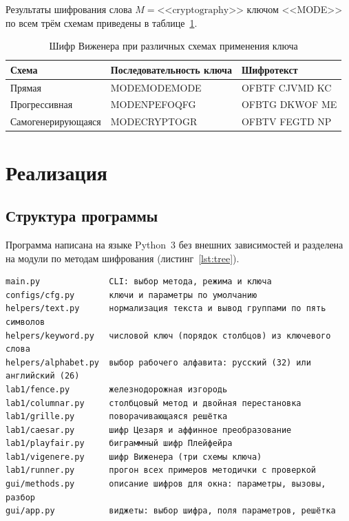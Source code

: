 \documentclass[14pt,a4paper]{extarticle}
\begin{document}
Результаты шифрования слова $M = \text{<<cryptography>>}$ ключом <<MODE>> по всем трём
схемам приведены в таблице~\ref{tab:vigenere}.

\begin{table}[H]
\caption{Шифр Виженера при различных схемах применения ключа}
\label{tab:vigenere}
\centering
\begin{tabularx}{\textwidth}{lXl}
\toprule
Схема & Последовательность ключа & Шифротекст \\
\midrule
Прямая & MODEMODEMODE & OFBTF CJVMD KC \\
Прогрессивная & MODENPEFOQFG & OFBTG DKWOF ME \\
Самогенерирующаяся & MODECRYPTOGR & OFBTV FEGTD NP \\
\bottomrule
\end{tabularx}
\end{table}

\section{Реализация}

\subsection{Структура программы}

Программа написана на языке Python~3 без внешних зависимостей и разделена на модули
по методам шифрования (листинг~\ref{lst:tree}).

\begin{Verbatim}[fontsize=\footnotesize, frame=single, samepage=true]
main.py              CLI: выбор метода, режима и ключа
configs/cfg.py       ключи и параметры по умолчанию
helpers/text.py      нормализация текста и вывод группами по пять символов
helpers/keyword.py   числовой ключ (порядок столбцов) из ключевого слова
helpers/alphabet.py  выбор рабочего алфавита: русский (32) или английский (26)
lab1/fence.py        железнодорожная изгородь
lab1/columnar.py     столбцовый метод и двойная перестановка
lab1/grille.py       поворачивающаяся решётка
lab1/caesar.py       шифр Цезаря и аффинное преобразование
lab1/playfair.py     биграммный шифр Плейфейра
lab1/vigenere.py     шифр Виженера (три схемы ключа)
lab1/runner.py       прогон всех примеров методички с проверкой
gui/methods.py       описание шифров для окна: параметры, вызовы, разбор
gui/app.py           виджеты: выбор шифра, поля параметров, решётка
\end{Verbatim}
\end{document}

